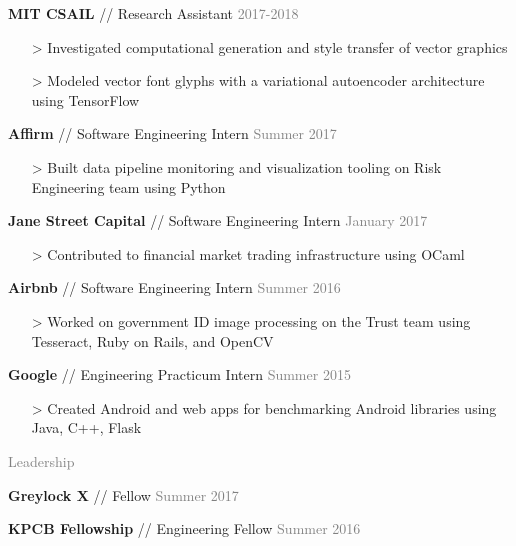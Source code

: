 \documentclass[11pt]{article}
\newcommand{\rsection}[1]{\vspace{1.5em}\textcolor{gray}{\Large \robotoslab #1}\vspace{0.5em}}
\newcommand{\bt}[1]{\textbf{#1}} %
\newcommand{\gap}[0]{\vspace{0.3em}} %
\newcommand{\sep}[0]{ // } %
\newcommand{\gray}[1]{\textcolor{gray}{#1}}
\newcommand{\e}[0]{> }
\begin{document}
\bt{MIT CSAIL}\sep Research Assistant \hfill \gray{2017-2018}

\begin{itemize}
\item[\e] Investigated computational generation and style transfer of vector graphics
\item[\e] Modeled vector font glyphs with a variational autoencoder architecture using TensorFlow
\end{itemize}


\bt{Affirm}\sep Software Engineering Intern \hfill \gray{Summer 2017}

\begin{itemize}
\item[\e] Built data pipeline monitoring and visualization tooling on Risk Engineering team using Python
\end{itemize}

\gap

\bt{Jane Street Capital}\sep Software Engineering Intern \hfill \gray{January 2017}

\begin{itemize}
\item[\e] Contributed to financial market trading infrastructure using OCaml
\end{itemize}

\gap

\bt{Airbnb}\sep Software Engineering Intern \hfill \gray{Summer 2016}

\begin{itemize}
\item[\e] Worked on government ID image processing on the Trust team using Tesseract, Ruby on Rails, and OpenCV
\end{itemize}

\gap

\bt{Google}\sep Engineering Practicum Intern \hfill \gray{Summer 2015}

\begin{itemize}
\item[\e] Created Android and web apps for benchmarking Android libraries using Java, C++, Flask
\end{itemize}


\rsection{Leadership}

\bt{Greylock X}\sep Fellow \hfill \gray{Summer 2017}

\gap

\bt{KPCB Fellowship}\sep Engineering Fellow \hfill \gray{Summer 2016}

\gap
\end{document}
